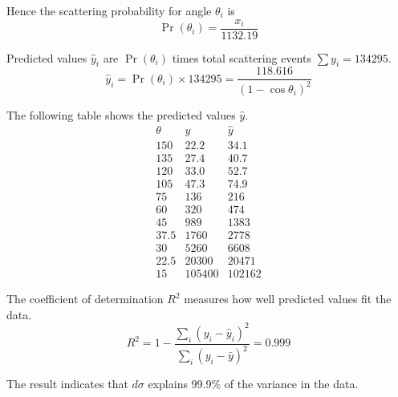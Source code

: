 Hence the scattering probability for angle $\theta_i$ is
\begin{equation*}
\Pr(\theta_i)=\frac{x_i}{1132.19}
\end{equation*}

Predicted values $\hat y_i$ are $\Pr(\theta_i)$
times total scattering events $\sum y_i=134295$.
\begin{equation*}
\hat y_i=\Pr(\theta_i)\times134295=\frac{118.616}{(1-\cos\theta_i)^2}
\end{equation*}

The following table shows the predicted values $\hat y$.
\begin{equation*}
\begin{matrix}
\theta & y & \hat y\\
150 & 22.2 & 34.1\\
135 & 27.4 & 40.7\\
120 & 33.0 & 52.7\\
105 & 47.3 & 74.9\\
75 & 136 & 216\\
60 & 320 & 474\\
45 & 989 & 1383\\
37.5 & 1760 & 2778\\
30 & 5260 & 6608\\
22.5 & 20300 & 20471\\
15 & 105400 & 102162
\end{matrix}
\end{equation*}

The coefficient of determination $R^2$ measures how well predicted values fit the data.
\begin{equation*}
R^2=1-\frac{\sum_i(y_i-\hat y_i)^2}{\sum_i(y_i-\bar y)^2}=0.999
\end{equation*}

The result indicates that $d\sigma$ explains 99.9\%
of the variance in the data.


